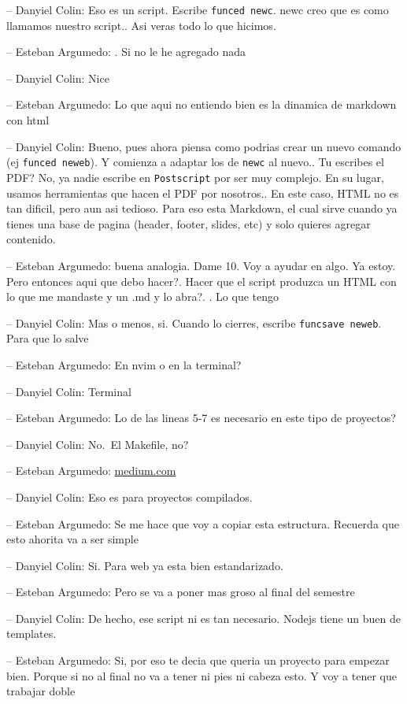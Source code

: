 -- Danyiel Colin: Eso es un script. Escribe \texttt{funced\ newc}. newc
creo que es como llamamos nuestro script.. Asi veras todo lo que
hicimos.

-- Esteban Argumedo: . Si no le he agregado nada

-- Danyiel Colin: Nice

-- Esteban Argumedo: Lo que aqui no entiendo bien es la dinamica de
markdown con html

-- Danyiel Colin: Bueno, pues ahora piensa como podrias crear un nuevo
comando (ej \texttt{funced\ neweb}). Y comienza a adaptar los de
\texttt{newc} al nuevo.. Tu escribes el PDF? No, ya nadie escribe en
\texttt{Postscript} por ser muy complejo. En su lugar, usamos
herramientas que hacen el PDF por nosotros.. En este caso, HTML no es
tan dificil, pero aun asi tedioso. Para eso esta Markdown, el cual sirve
cuando ya tienes una base de pagina (header, footer, slides, etc) y solo
quieres agregar contenido.

-- Esteban Argumedo: buena analogia. Dame 10. Voy a ayudar en algo. Ya
estoy. Pero entonces aqui que debo hacer?. Hacer que el script produzca
un HTML con lo que me mandaste y un .md y lo abra?. . Lo que tengo

-- Danyiel Colin: Mas o menos, si. Cuando lo cierres, escribe
\texttt{funcsave\ neweb}. Para que lo salve

-- Esteban Argumedo: En nvim o en la terminal?

-- Danyiel Colin: Terminal

-- Esteban Argumedo: Lo de las lineas 5-7 es necesario en este tipo de
proyectos?

-- Danyiel Colin: No.~El Makefile, no?

-- Esteban Argumedo:
\href{https://medium.com/@nmayurashok/file-and-folder-structure-for-web-development-8c5c83810a5}{medium.com}

-- Danyiel Colin: Eso es para proyectos compilados.

-- Esteban Argumedo: Se me hace que voy a copiar esta estructura.
Recuerda que esto ahorita va a ser simple

-- Danyiel Colin: Si. Para web ya esta bien estandarizado.

-- Esteban Argumedo: Pero se va a poner mas groso al final del semestre

-- Danyiel Colin: De hecho, ese script ni es tan necesario. Nodejs tiene
un buen de templates.

-- Esteban Argumedo: Si, por eso te decia que queria un proyecto para
empezar bien. Porque si no al final no va a tener ni pies ni cabeza
esto. Y voy a tener que trabajar doble


